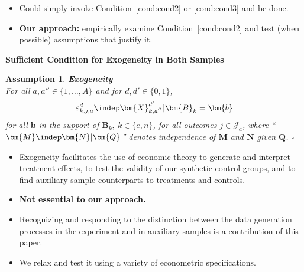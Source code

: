 \documentclass[static]{JJH-Beamer}
\newtheorem{assumption}{Assumption}
\begin{document}
\begin{frame}

\begin{itemize}
\item Could simply invoke Condition~\ref{cond:cond2} or \ref{cond:cond3} and be done.
\item \textbf{Our approach:} empirically examine Condition~\ref{cond:cond2} and test (when possible) assumptions that justify it.
\end{itemize}

\end{frame}

\begin{frame}

\begin{center}
\textbf{Sufficient Condition for Exogeneity in Both Samples}
\end{center}

\begin{assumption}\label{ass:exog} \textbf{Exogeneity}\\
For all $a, a'' \in \{ 1, \ldots, A \}$ and for $d, d' \in \{0,1\}$,
\begin{equation}
\varepsilon^d_{k,j,a} \indep \bm{X}^{d^{\prime}}_{k,a^{''}} | \bm{B}_k = \bm{b}
\end{equation}
for all $\bm{b}$ in the support of $\bm{B}_k, \: k \in \{e,n\}$, for all outcomes $j \in \mathcal{J}_{a}$, where ``$\bm{M} \indep \bm{N}|\bm{Q}$'' denotes independence of $\bm{M}$ and $\bm{N}$ given $\bm{Q}$. $\square$
\end{assumption}

\end{frame}

\begin{frame}

\begin{itemize}
\item Exogeneity facilitates the use of economic theory to generate and interpret treatment effects, to test the validity of our synthetic control groups, and to find auxiliary sample counterparts to treatments and controls.
\item \textbf{Not essential to our approach.}
\item Recognizing and responding to the distinction between the data generation processes in the experiment and in auxiliary samples is a contribution of this paper.
\item We relax and test it using a variety of econometric specifications.
\end{itemize}

\end{frame}
\end{document}
